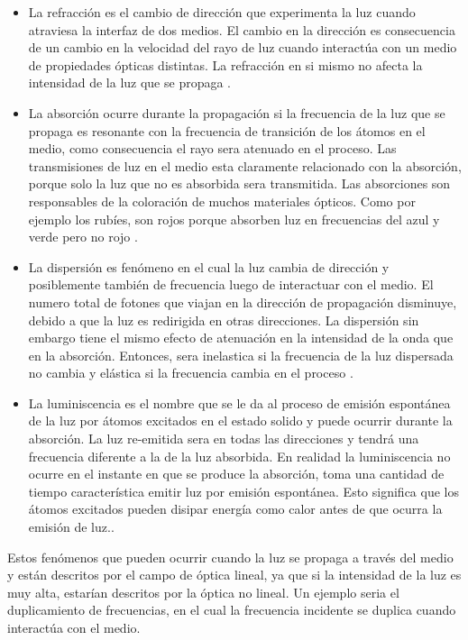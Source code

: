 \documentclass[a4paper,openright,12pt]{book}
\begin{document}
\begin{itemize}
\item La refracción es el cambio de dirección que experimenta la luz cuando atraviesa la interfaz de dos medios. El cambio en la dirección es consecuencia de un cambio en la velocidad del rayo de luz cuando interactúa con un medio de propiedades ópticas distintas. La refracción en si mismo no afecta la intensidad de la luz que se propaga \cite{MarkFox}.

\item La absorción ocurre durante la propagación si la frecuencia de la luz que se propaga es resonante con la frecuencia de transición de los átomos en el medio, como consecuencia el rayo sera atenuado en el proceso. Las transmisiones de luz en el medio esta claramente relacionado con la absorción, porque solo la luz que no es absorbida sera transmitida. Las absorciones son responsables de la coloración de muchos materiales ópticos. Como por ejemplo los rubíes, son rojos porque absorben luz en frecuencias del azul y verde pero no rojo \cite{MarkFox}.

\item La dispersión es fenómeno en el cual la luz cambia de dirección y posiblemente también de frecuencia luego de interactuar con el medio. El numero total de fotones que viajan en la dirección de propagación disminuye, debido a que la luz es redirigida en otras direcciones. La dispersión sin embargo tiene el mismo efecto de atenuación en la intensidad de la onda que en la absorción. Entonces, sera inelastica si la frecuencia de la luz dispersada no cambia y elástica si la frecuencia cambia en el proceso \cite{MarkFox}.

\item La luminiscencia es el nombre que se le da al proceso de emisión espontánea de la luz por átomos excitados en el estado solido y puede ocurrir durante la absorción. La luz re-emitida sera en todas las direcciones y tendrá una frecuencia diferente a la de la luz absorbida. En realidad la luminiscencia no ocurre en el instante en que se produce la absorción, toma una cantidad de tiempo característica emitir luz por emisión espontánea. Esto significa que los átomos excitados pueden disipar energía como calor antes de que ocurra la emisión de luz.\cite{MarkFox}.
\end{itemize}

Estos fenómenos que pueden ocurrir cuando la luz se propaga a través del medio y están descritos por el campo de óptica lineal, ya que si la intensidad de la luz es muy alta, estarían descritos por la óptica no lineal. Un ejemplo seria el duplicamiento de frecuencias, en el cual la frecuencia incidente se duplica cuando interactúa con el medio.
\end{document}

